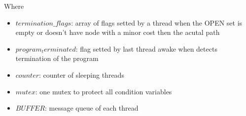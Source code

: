 Where
\begin{itemize}
    \item $termination\_flags$: array of flags setted by a thread when the OPEN set is empty or doesn't have node with a minor cost then the acutal path
    \item $program_terminated$: flag setted by last thread awake when detects termination of the program
    \item $counter$: counter of sleeping threads
    \item $mutex$: one mutex to protect all condition variables
    \item $BUFFER$: message queue of each thread
\end{itemize}

